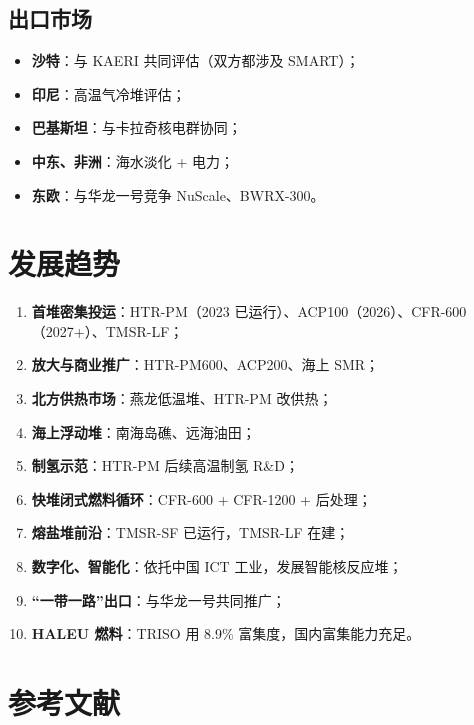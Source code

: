 \documentclass[
  UTF8,
  scheme=plain,
  fontsize=10pt,
  openany
]{ctexbook}
\begin{document}
\subsection{出口市场}\label{ux51faux53e3ux5e02ux573a-1}

\begin{itemize}
\tightlist
\item
  \textbf{沙特}：与 KAERI 共同评估（双方都涉及 SMART）；
\item
  \textbf{印尼}：高温气冷堆评估；
\item
  \textbf{巴基斯坦}：与卡拉奇核电群协同；
\item
  \textbf{中东、非洲}：海水淡化 + 电力；
\item
  \textbf{东欧}：与华龙一号竞争 NuScale、BWRX-300。
\end{itemize}

\section{发展趋势}\label{ux53d1ux5c55ux8d8bux52bf-4}

\begin{enumerate}
\def\labelenumi{\arabic{enumi}.}
\tightlist
\item
  \textbf{首堆密集投运}：HTR-PM（2023
  已运行）、ACP100（2026）、CFR-600（2027+）、TMSR-LF；
\item
  \textbf{放大与商业推广}：HTR-PM600、ACP200、海上 SMR；
\item
  \textbf{北方供热市场}：燕龙低温堆、HTR-PM 改供热；
\item
  \textbf{海上浮动堆}：南海岛礁、远海油田；
\item
  \textbf{制氢示范}：HTR-PM 后续高温制氢 R\&D；
\item
  \textbf{快堆闭式燃料循环}：CFR-600 + CFR-1200 + 后处理；
\item
  \textbf{熔盐堆前沿}：TMSR-SF 已运行，TMSR-LF 在建；
\item
  \textbf{数字化、智能化}：依托中国 ICT 工业，发展智能核反应堆；
\item
  \textbf{``一带一路''出口}：与华龙一号共同推广；
\item
  \textbf{HALEU 燃料}：TRISO 用 8.9\% 富集度，国内富集能力充足。
\end{enumerate}

\section{参考文献}\label{ux53c2ux8003ux6587ux732e-15}
\end{document}
